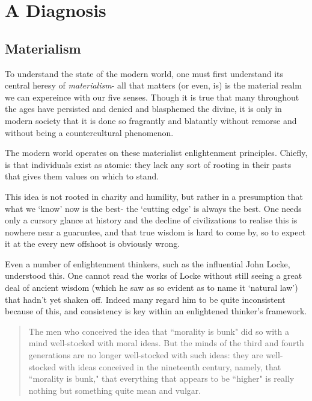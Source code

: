 \documentclass[letterpaper]{article}
\begin{document}
\iffalse
I took upon the cross to learn and manifest this \textit{μέθεξις}. With my station as an engineer, and in a world dominated by technology, this seemed quite obviously to be initiated by studying what our relationship towards our technology ought to be.
\fi


\section{A Diagnosis}


\subsection{Materialism}

To understand the state of the modern world, one must first understand its central heresy of \textit{materialism}- all that matters (or even, is) is the material realm we can expereince with our five senses. Though it is true that many throughout the ages have persisted and denied and blasphemed the divine, it is only in modern society that it is done so fragrantly and blatantly without remorse and without being a countercultural phenomenon.

The modern world operates on these materialist enlightenment principles. Chiefly, is that individuals exist as atomic: they lack any sort of rooting in their pasts that gives them values on which to stand.

This idea is not rooted in charity and humility, but rather in a presumption that what we `know' now is the best- the `cutting edge' is always the best. One needs only a cursory glance at history and the decline of civilizations to realise this is nowhere near a guaruntee, and that true wisdom is hard to come by, so to expect it at the every new offshoot is obviously wrong.

Even a number of enlightenment thinkers, such as the influential John Locke, understood this. One cannot read the works of Locke without still seeing a great deal of ancient wisdom (which he saw as so evident as to name it `natural law') that hadn't yet shaken off. Indeed many regard him to be quite inconsistent because of this, and consistency is key within an enlightened thinker's framework.

\begin{quote}
  The men who conceived the idea that ``morality is bunk" did so with a mind well-stocked with moral ideas. But the minds of the third and fourth generations are no longer well-stocked with such ideas: they are well-stocked with ideas conceived in the nineteenth century, namely, that ``morality is bunk," that everything that appears to be ``higher" is really nothing but something quite mean and vulgar.
\end{quote}
\end{document}
